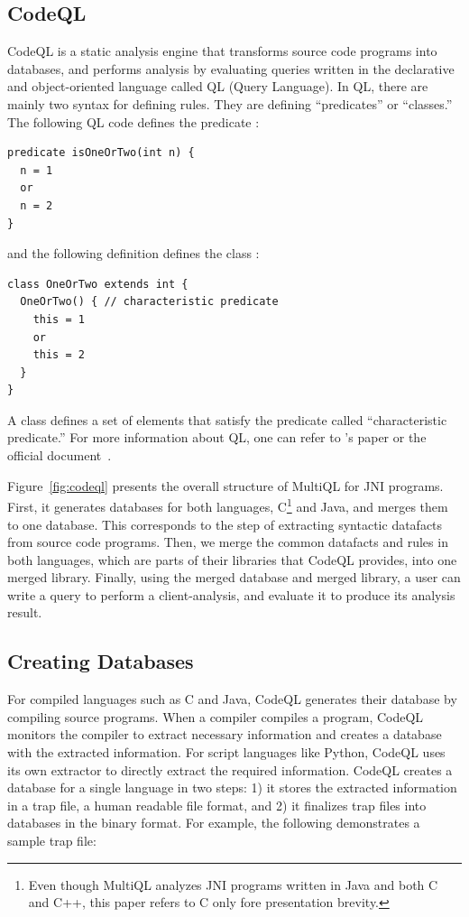 \subsection{CodeQL}
CodeQL is a static analysis engine that transforms source code programs into
databases, and performs analysis by evaluating queries written in the
declarative and object-oriented language called QL (Query Language).
In QL, there are mainly two syntax for defining rules.
They are defining ``predicates'' or ``classes.''
The following QL code defines the predicate :
\begin{lstlisting}[style=codeql,xleftmargin=2.5em]
predicate isOneOrTwo(int n) {
  n = 1
  or
  n = 2
}
\end{lstlisting}
and the following definition defines the class :
\begin{lstlisting}[style=codeql,xleftmargin=2.5em]
class OneOrTwo extends int {
  OneOrTwo() { // characteristic predicate
    this = 1
    or
    this = 2
  }
}
\end{lstlisting}
A class defines a set of elements that satisfy the predicate called
``characteristic predicate.''
For more information about QL, one can refer to \citet{ql2016}'s paper
or the official document~\cite{codeql}.

Figure~\ref{fig:codeql} presents the overall structure of MultiQL for JNI programs.
First, it generates databases for both languages, C\footnote{
Even though MultiQL analyzes JNI programs written in Java and both C and
C++, this paper refers to C only fore presentation brevity.} and
Java, and merges them to one database.  This corresponds
to the step of extracting syntactic datafacts from source code programs.
Then, we merge the common datafacts and rules in both languages,
which are parts of their libraries that CodeQL provides, into one merged library.
Finally, using the merged database and merged library, a user can write a query to
perform a client-analysis, and evaluate it to produce its analysis result.

\subsection{Creating Databases}
For compiled languages such as C and Java, CodeQL generates their database
by compiling source programs.  When a compiler compiles a program,
CodeQL monitors the compiler to extract necessary information and
creates a database with the extracted information. For script languages like Python,
CodeQL uses its own extractor to directly extract the required information.
CodeQL creates a database for a single language in two steps:
1) it stores the extracted information in a trap
file, a human readable file format, and 2) it finalizes trap files
into databases in the binary format. For example, the
following demonstrates a sample trap file:

